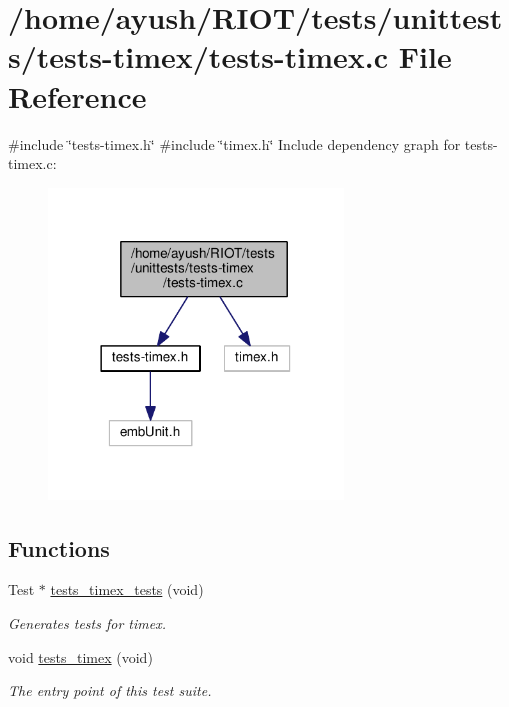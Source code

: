 \hypertarget{tests-timex_8c}{}\section{/home/ayush/\+R\+I\+O\+T/tests/unittests/tests-\/timex/tests-\/timex.c File Reference}
\label{tests-timex_8c}
{\ttfamily \#include \char`\"{}tests-\/timex.\+h\char`\"{}}\newline
{\ttfamily \#include \char`\"{}timex.\+h\char`\"{}}\newline
Include dependency graph for tests-\/timex.c\+:
\nopagebreak
\begin{figure}[H]
\begin{center}
\leavevmode
\includegraphics[width=222pt]{tests-timex_8c__incl}
\end{center}
\end{figure}
\subsection*{Functions}
\begin{DoxyCompactItemize}
\item 
Test $\ast$ \hyperlink{group__unittests_ga8e6c61c50f2b2580f16effebba8a7e83}{tests\+\_\+timex\+\_\+tests} (void)
\begin{DoxyCompactList}\small\item\em Generates tests for timex. \end{DoxyCompactList}\item 
void \hyperlink{group__unittests_gad66683ae3365683aba4d469e07ce6799}{tests\+\_\+timex} (void)
\begin{DoxyCompactList}\small\item\em The entry point of this test suite. \end{DoxyCompactList}\end{DoxyCompactItemize}
